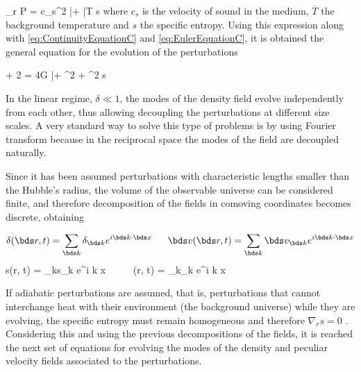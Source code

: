 { \nabla_r P = c_s^2 \bar \rho \nabla \delta + 
\bar T \rho \nabla s }
where $c_s$ is the velocity of sound in the medium, $\overline T$ the 
background temperature and $s$ the specific entropy. Using this expression
along with \ref{eq:ContinuityEquationC} and \ref{eq:EulerEquationC}, it is
obtained the general equation for the evolution of the perturbations



{  + 2  = 
4\pi G \bar \rho \delta + \nabla^2 \delta +
\nabla^2 s }


In the linear regime, $\delta \ll 1$, the modes of the density field 
evolve independently from each other, thus allowing decoupling the 
perturbations at different size scales. A very standard way to solve this 
type of problems is by using Fourier transform because in the reciprocal 
space the modes of the field are decoupled naturally.


Since it has been assumed perturbations with characteristic lengths 
smaller than the Hubble's radius, the volume of the observable universe 
can be considered finite, and therefore decomposition of the fields 
in comoving coordinates becomes discrete, obtaining

 

\[  \delta(\bds r, t) =  \sum_{\bds k}\delta_{\bds k} e^{i \bds k \cdot \bds x} 
\ \ \ \ \ 
	\bds v(\bds r, t) =  \sum_{\bds k}\bds v_{\bds k} e^{i \bds k \cdot \bds x}\]
\eq{eq:FourierFields}
{  s(\bds r, t) =  \sum_{\bds k}s_{\bds k} e^{i \bds k \cdot \bds x} 
\ \ \ \ \ 
	\Phi(\bds r, t) =  \sum_{\bds k}\Phi_{\bds k} e^{i \bds k \cdot \bds x}}


If adiabatic perturbations are assumed, that is, perturbations that 
cannot interchange heat with their environment (the background universe) 
while they are evolving, the specific entropy must remain homogeneous and
therefore $\nabla_r s = 0$ \cite{longair2008}. Considering this and using
the previous decompositions of the fields, it is reached the next set of 
equations for evolving the modes of the density and peculiar velocity 
fields associated to the perturbations.



